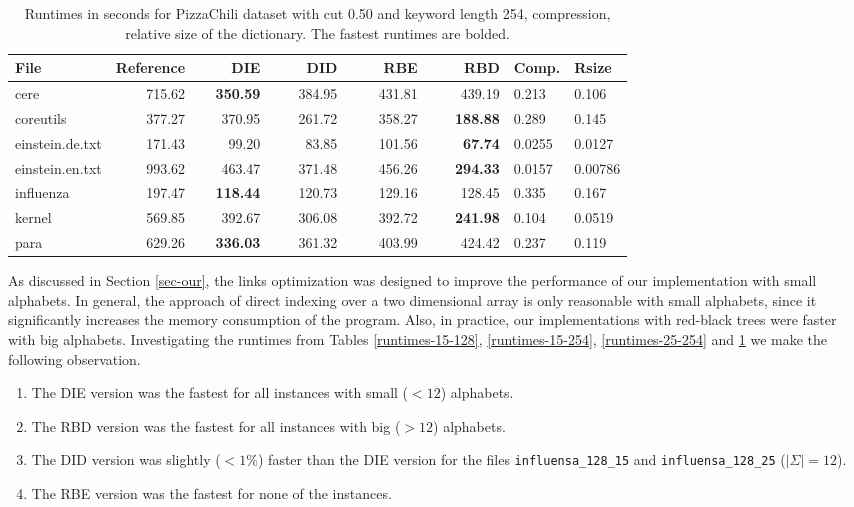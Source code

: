 \documentclass[english,twoside,censored,csm,algorithms-track-2020]{HYthesisML}
\theoremstyle{plain}
\theoremstyle{definition}
\begin{document}
\begin{center}
  \begin{table}
  \begin{tabular} {| l |r r r r r|l l|}
    \hline
    \textbf{File} & \textbf{Reference} & ~~~~\textbf{DIE} & ~~~~\textbf{DID} & ~~~~\textbf{RBE} & ~~~~\textbf{RBD} & \textbf{Comp.} & \textbf{Rsize} \\
    \hline
    cere & 715.62 & \textbf{350.59} & 384.95 & 431.81 & 439.19            & 0.213  & 0.106   \\
    coreutils & 377.27 & 370.95 & 261.72 & 358.27 & \textbf{188.88}       & 0.289  & 0.145   \\
    einstein.de.txt & 171.43 & 99.20 & 83.85 & 101.56 & \textbf{67.74}    & 0.0255 & 0.0127  \\
    einstein.en.txt & 993.62 & 463.47 & 371.48 & 456.26 & \textbf{294.33} & 0.0157 & 0.00786 \\
    influenza & 197.47 & \textbf{118.44} & 120.73 & 129.16 & 128.45       & 0.335  & 0.167   \\
    kernel & 569.85 & 392.67 & 306.08 & 392.72 & \textbf{241.98}          & 0.104  & 0.0519  \\
    para & 629.26 & \textbf{336.03} & 361.32 & 403.99 & 424.42            & 0.237  & 0.119   \\
    \hline
  \end{tabular}
  \caption{Runtimes in seconds for PizzaChili dataset with cut 0.50 and keyword length 254, compression, relative size of the dictionary. The fastest runtimes are bolded.}
  \label{runtimes-50-254}
  \end{table}
\end{center}

\vspace{-4cm}
As discussed in Section \ref{sec-our}, the links optimization was designed to improve the performance
of our implementation with small alphabets. In general, the approach of direct indexing over a two
dimensional array is only reasonable with small alphabets, since it significantly increases
the memory consumption of the program. Also, in practice, our implementations with red-black trees
were faster with big alphabets. Investigating the runtimes from Tables \ref{runtimes-15-128},
\ref{runtimes-15-254}, \ref{runtimes-25-254} and \ref{runtimes-50-254} we make the following observation.

\begin{enumerate}
\item The DIE version was the fastest for all instances with small ($<12$) alphabets.
\item The RBD version was the fastest for all instances with big ($>12$) alphabets.
\item The DID version was slightly ($<1\%$) faster than the DIE version for the files \texttt{influensa\_128\_15} and \texttt{influensa\_128\_25} ($|\Sigma| = 12$).
\item The RBE version was the fastest for none of the instances.
\end{enumerate}
\end{document}
